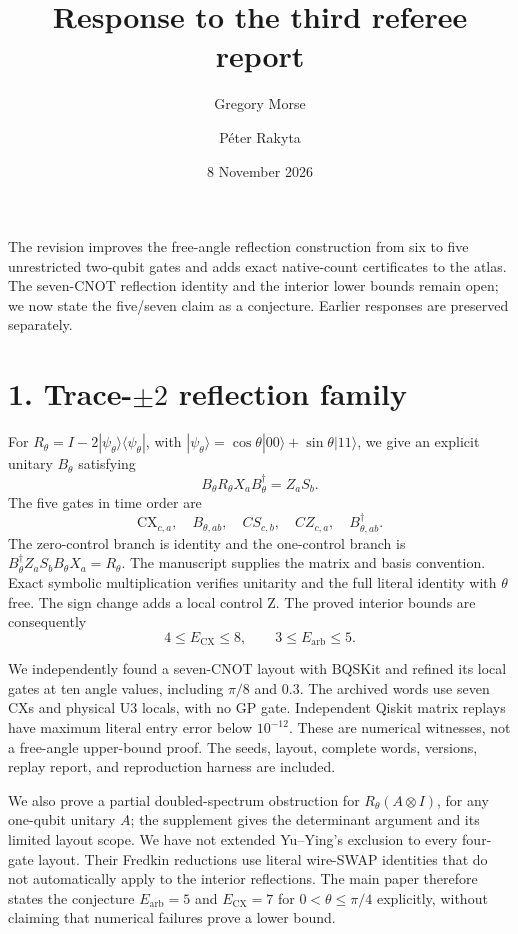 \documentclass[11pt]{article}
\title{Response to the third referee report}
\author{Gregory Morse \and P\'eter Rakyta}\date{8 November 2026}
\begin{document}
\maketitle
The revision improves the free-angle reflection construction from six to
five unrestricted two-qubit gates and adds exact native-count certificates
to the atlas. The seven-CNOT reflection identity and the interior lower
bounds remain open; we now state the five/seven claim as a conjecture.
Earlier responses are preserved separately.

\section*{1. Trace-$\pm2$ reflection family}
For $R_\theta=I-2|\psi_\theta\rangle\langle\psi_\theta|$, with
$|\psi_\theta\rangle=\cos\theta|00\rangle+\sin\theta|11\rangle$,
we give an explicit unitary $B_\theta$ satisfying
\[
 B_\theta R_\theta X_a B_\theta^\dagger=Z_aS_b.
\]
The five gates in time order are
\[
 \mathrm{CX}_{c,a},\quad B_{\theta,ab},\quad CS_{c,b},\quad
 CZ_{c,a},\quad B_{\theta,ab}^\dagger.
\]
The zero-control branch is identity and the one-control branch is
$B_\theta^\dagger Z_aS_bB_\theta X_a=R_\theta$.
The manuscript supplies the matrix and basis convention. Exact symbolic
multiplication verifies unitarity and the full literal identity with
$\theta$ free. The sign change adds a local control Z.
The proved interior bounds are consequently
\[
 4\le E_{\mathrm{CX}}\le8,\qquad
 3\le E_{\mathrm{arb}}\le5.
\]

We independently found a seven-CNOT layout with BQSKit and refined its
local gates at ten angle values, including $\pi/8$ and $0.3$. The archived
words use seven CXs and physical U3 locals, with no GP gate. Independent
Qiskit matrix replays have maximum literal entry error below $10^{-12}$.
These are numerical witnesses, not a free-angle upper-bound proof.
The seeds, layout, complete words, versions, replay report, and reproduction
harness are included.

We also prove a partial doubled-spectrum obstruction for
$R_\theta(A\otimes I)$, for any one-qubit unitary $A$; the supplement gives
the determinant argument and its limited layout scope. We have not extended
Yu--Ying's exclusion to every four-gate layout. Their Fredkin reductions
use literal wire-SWAP identities that do not automatically apply to the
interior reflections. The main paper therefore states the conjecture
$E_{\mathrm{arb}}=5$ and $E_{\mathrm{CX}}=7$ for $0<\theta\le\pi/4$
explicitly, without claiming that numerical failures prove a lower bound.
\end{document}
